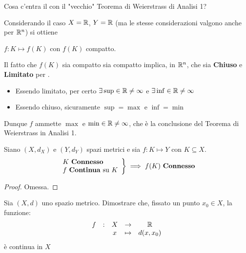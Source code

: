 \begin{exercise}
	\label{teo:weier_analisi_1}
	Cosa c'entra il  con il "vecchio" Teorema di Weierstrass di Analisi 1?
	\begin{solution}
		Considerando il caso $X = \mathbb{R}$, $Y = \mathbb{R}$ (ma le stesse considerazioni valgono anche per $\mathbb{R}^n$) si ottiene
		\begin{center}
			$f:K \mapsto f(K)$ con $f(K)$ compatto.
		\end{center}
		Il fatto che $f(K)$ sia compatto sia compatto implica, in $\mathbb{R}^n$, che sia \textbf{Chiuso} e \textbf{Limitato} per .
		\begin{itemize}
			\item Essendo limitato, per certo $\exists \sup \in \mathbb{R} \neq \infty$ e $\exists \inf \in \mathbb{R} \neq \infty$
			\item Essendo chiuso, sicuramente $\sup = \max$ e $\inf = \min$
		\end{itemize}
		Dunque $f$ ammette $\max$ e $\min \in \mathbb{R} \neq \infty$, che è la conclusione del Teorema di Weierstrass in Analisi 1.
	\end{solution}
\end{exercise}
\begin{proposition}
	\label{prop:f_di_conn_cont_e_conn}
	Siano $(X,d_X)$ e $(Y,d_Y)$ spazi metrici e sia $f:K \mapsto Y$ con $K \subseteq X$.
	\begin{equation*}
		\left.
		\begin{array}{l}
		K \text{ \textbf{Connesso}} \\
		f \text{ \textbf{Continua} su } K
		\end{array}
		\right\} \implies
		f(K) \text{ \textbf{Connesso}}
	\end{equation*}
	\begin{proof}
		Omessa.
	\end{proof}
\end{proposition}
\begin{exercise}
	Sia $(X,d)$ uno spazio metrico. Dimostrare che, fissato un punto $x_0 \in X$, la funzione:
	\[\begin{array}{ccccc} {f} & : & {X} & \to & {\mathbb{R}} \\ & & {x} & \mapsto & {d(x,x_0)} \\ \end{array}\]
	è continua in $X$
\end{exercise}

